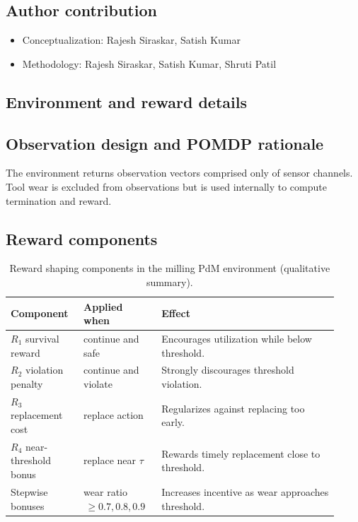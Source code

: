 \documentclass[sn-basic]{sn-jnl} %
\begin{document}
\subsection*{Author contribution}
\begin{itemize}
        \item Conceptualization: Rajesh Siraskar, Satish Kumar
        \item Methodology: Rajesh Siraskar, Satish Kumar, Shruti Patil
\end{itemize}

\begin{appendices}

\section{Environment and reward details}
\label{app:env_reward}
\subsection{Observation design and POMDP rationale}
The environment returns observation vectors comprised only of sensor channels. Tool wear is excluded from observations but is used internally to compute termination and reward.

\subsection{Reward components}
\begin{table}[t]
        \centering
        \caption{Reward shaping components in the milling PdM environment (qualitative summary).}
        \label{tab:reward_components}
        \begin{tabular}{p{0.20\linewidth} p{0.22\linewidth} p{0.50\linewidth}}
                \toprule
                \textbf{Component} & \textbf{Applied when} & \textbf{Effect}\\
                \midrule
                $R_1$ survival reward & continue and safe & Encourages utilization while below threshold.\\
                $R_2$ violation penalty & continue and violate & Strongly discourages threshold violation.\\
                $R_3$ replacement cost & replace action & Regularizes against replacing too early.\\
                $R_4$ near-threshold bonus & replace near $\tau$ & Rewards timely replacement close to threshold.\\
                Stepwise bonuses & wear ratio $\,\ge 0.7, 0.8, 0.9$ & Increases incentive as wear approaches threshold.\\
                \bottomrule
        \end{tabular}
\end{table}


\end{appendices}
\end{document}
